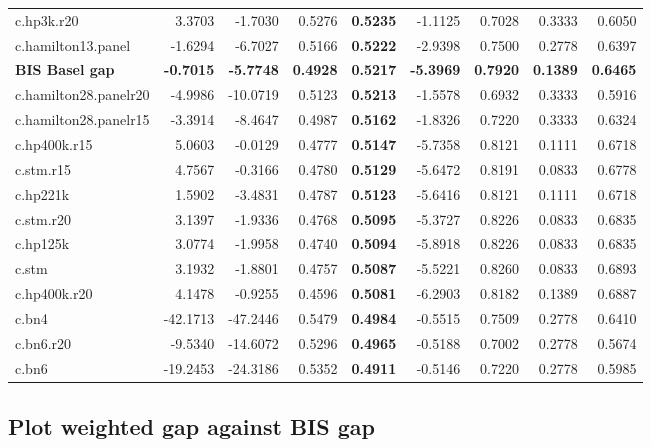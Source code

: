\documentclass[
  12pt,
]{article}
\begin{document}
\begin{table}[H]
{\begin{tabular}[t]{lrrr>{}rrrrr}
c.hp3k.r20 & 3.3703 & -1.7030 & 0.5276 & \textbf{0.5235} & -1.1125 & 0.7028 & 0.3333 & 0.6050\\
c.hamilton13.panel & -1.6294 & -6.7027 & 0.5166 & \textbf{0.5222} & -2.9398 & 0.7500 & 0.2778 & 0.6397\\
\textbf{BIS Basel gap} & \textbf{-0.7015} & \textbf{-5.7748} & \textbf{0.4928} & \textbf{\textbf{0.5217}} & \textbf{-5.3969} & \textbf{0.7920} & \textbf{0.1389} & \textbf{0.6465}\\
c.hamilton28.panelr20 & -4.9986 & -10.0719 & 0.5123 & \textbf{0.5213} & -1.5578 & 0.6932 & 0.3333 & 0.5916\\
\addlinespace
c.hamilton28.panelr15 & -3.3914 & -8.4647 & 0.4987 & \textbf{0.5162} & -1.8326 & 0.7220 & 0.3333 & 0.6324\\
c.hp400k.r15 & 5.0603 & -0.0129 & 0.4777 & \textbf{0.5147} & -5.7358 & 0.8121 & 0.1111 & 0.6718\\
c.stm.r15 & 4.7567 & -0.3166 & 0.4780 & \textbf{0.5129} & -5.6472 & 0.8191 & 0.0833 & 0.6778\\
c.hp221k & 1.5902 & -3.4831 & 0.4787 & \textbf{0.5123} & -5.6416 & 0.8121 & 0.1111 & 0.6718\\
c.stm.r20 & 3.1397 & -1.9336 & 0.4768 & \textbf{0.5095} & -5.3727 & 0.8226 & 0.0833 & 0.6835\\
\addlinespace
c.hp125k & 3.0774 & -1.9958 & 0.4740 & \textbf{0.5094} & -5.8918 & 0.8226 & 0.0833 & 0.6835\\
c.stm & 3.1932 & -1.8801 & 0.4757 & \textbf{0.5087} & -5.5221 & 0.8260 & 0.0833 & 0.6893\\
c.hp400k.r20 & 4.1478 & -0.9255 & 0.4596 & \textbf{0.5081} & -6.2903 & 0.8182 & 0.1389 & 0.6887\\
c.bn4 & -42.1713 & -47.2446 & 0.5479 & \textbf{0.4984} & -0.5515 & 0.7509 & 0.2778 & 0.6410\\
c.bn6.r20 & -9.5340 & -14.6072 & 0.5296 & \textbf{0.4965} & -0.5188 & 0.7002 & 0.2778 & 0.5674\\
\addlinespace
c.bn6 & -19.2453 & -24.3186 & 0.5352 & \textbf{0.4911} & -0.5146 & 0.7220 & 0.2778 & 0.5985\\
\bottomrule
\end{tabular}}
\end{table}

\hypertarget{plot-weighted-gap-against-bis-gap}{%
\subsection{Plot weighted gap against BIS gap}\label{plot-weighted-gap-against-bis-gap}}
\end{document}
